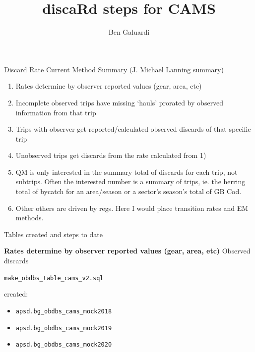 \documentclass[
  ignorenonframetext,
]{beamer}
\title{discaRd steps for CAMS}
\author{Ben Galuardi}
\date{}
\providecommand{\tightlist}{%
  \setlength{\itemsep}{0pt}\setlength{\parskip}{0pt}}
\begin{document}
\frame{\titlepage}

\begin{frame}{Discard Rate Current Method Summary (J. Michael Lanning
summary)}
\protect\hypertarget{discard-rate-current-method-summary-j.-michael-lanning-summary}{}

\begin{enumerate}
\tightlist
\item
  Rates determine by observer reported values (gear, area, etc)
\item
  Incomplete observed trips have missing `hauls' prorated by observed
  information from that trip
\item
  Trips with observer get reported/calculated observed discards of that
  specific trip
\item
  Unobserved trips get discards from the rate calculated from 1)
\item
  QM is only interested in the summary total of discards for each trip,
  not subtrips. Often the interested number is a summary of trips, ie.
  the herring total of bycatch for an area/season or a sector's season's
  total of GB Cod.
\item
  Other others are driven by regs. Here I would place transition rates
  and EM methods.
\end{enumerate}

\end{frame}

\begin{frame}[fragile]{Tables created and steps to date}
\protect\hypertarget{tables-created-and-steps-to-date}{}

\textbf{Rates determine by observer reported values (gear, area, etc)}
Observed discards

\texttt{make\_obdbs\_table\_cams\_v2.sql}

created:

\begin{itemize}
\tightlist
\item
  \texttt{apsd.bg\_obdbs\_cams\_mock2018}
\item
  \texttt{apsd.bg\_obdbs\_cams\_mock2019}
\item
  \texttt{apsd.bg\_obdbs\_cams\_mock2020}
\end{itemize}

\end{frame}
\end{document}
